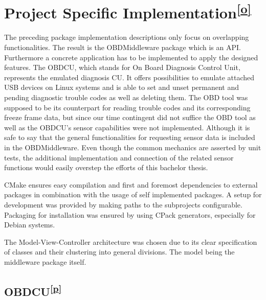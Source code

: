{}

\hypertarget{h.upb9og5wn4q0}{\section{\texorpdfstring{{Project Specific
Implementation}\textsuperscript{\protect\hyperlink{cmnt15}{{[}o{]}}}}{Project Specific Implementation{[}o{]}}}\label{h.upb9og5wn4q0}}

{The preceding package implementation descriptions only focus on
overlapping functionalities. The result is the OBDMiddleware package
which is an API. Furthermore a concrete application has to be
implemented to apply the designed features. The OBDCU, which stands for
On Board Diagnosis Control Unit, represents the emulated diagnosis CU.
It offers possibilities to emulate attached USB devices on Linux systems
and is able to set and unset permanent and pending diagnostic trouble
codes as well as deleting them. The OBD tool was supposed to be its
counterpart for reading trouble codes and its corresponding freeze frame
data, but since our time contingent did not suffice the OBD tool as well
as the OBDCU's sensor capabilities were not implemented. Although it is
safe to say that the general functionalities for requesting sensor data
is included in the OBDMiddleware. Even though the common mechanics are
asserted by unit tests, the additional implementation and connection of
the related sensor functions would easily overstep the efforts of this
bachelor thesis.}

{CMake ensures easy compilation and first and foremost dependencies to
external packages in combination with the usage of self implemented
packages. A setup for development was provided by making paths to the
subprojects configurable. Packaging for installation was ensured by
using CPack generators, especially for Debian systems. }

{The Model-View-Controller architecture was chosen due to its clear
specification of classes and their clustering into general divisions.
The model being the middleware package itself.}

\hypertarget{h.dfu1gktb8xw}{\subsection{\texorpdfstring{{OBDCU}\textsuperscript{\protect\hyperlink{cmnt16}{{[}p{]}}}}{OBDCU{[}p{]}}}\label{h.dfu1gktb8xw}}

